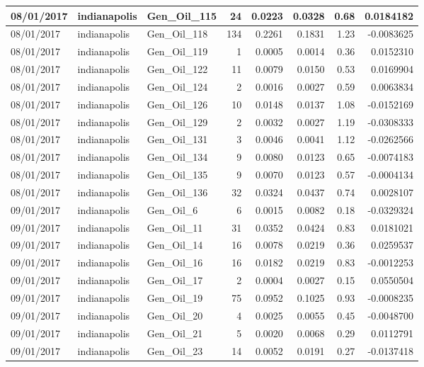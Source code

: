 \documentclass[
  letterpaper,
  DIV=11,
  numbers=noendperiod]{scrartcl}
\begin{document}
\begin{tabular}{l|l|l|r|r|r|r|r}
\hline
08/01/2017 & indianapolis & Gen\_Oil\_115 & 24 & 0.0223 & 0.0328 & 0.68 & 0.0184182\\
\hline
08/01/2017 & indianapolis & Gen\_Oil\_118 & 134 & 0.2261 & 0.1831 & 1.23 & -0.0083625\\
\hline
08/01/2017 & indianapolis & Gen\_Oil\_119 & 1 & 0.0005 & 0.0014 & 0.36 & 0.0152310\\
\hline
08/01/2017 & indianapolis & Gen\_Oil\_122 & 11 & 0.0079 & 0.0150 & 0.53 & 0.0169904\\
\hline
08/01/2017 & indianapolis & Gen\_Oil\_124 & 2 & 0.0016 & 0.0027 & 0.59 & 0.0063834\\
\hline
08/01/2017 & indianapolis & Gen\_Oil\_126 & 10 & 0.0148 & 0.0137 & 1.08 & -0.0152169\\
\hline
08/01/2017 & indianapolis & Gen\_Oil\_129 & 2 & 0.0032 & 0.0027 & 1.19 & -0.0308333\\
\hline
08/01/2017 & indianapolis & Gen\_Oil\_131 & 3 & 0.0046 & 0.0041 & 1.12 & -0.0262566\\
\hline
08/01/2017 & indianapolis & Gen\_Oil\_134 & 9 & 0.0080 & 0.0123 & 0.65 & -0.0074183\\
\hline
08/01/2017 & indianapolis & Gen\_Oil\_135 & 9 & 0.0070 & 0.0123 & 0.57 & -0.0004134\\
\hline
08/01/2017 & indianapolis & Gen\_Oil\_136 & 32 & 0.0324 & 0.0437 & 0.74 & 0.0028107\\
\hline
09/01/2017 & indianapolis & Gen\_Oil\_6 & 6 & 0.0015 & 0.0082 & 0.18 & -0.0329324\\
\hline
09/01/2017 & indianapolis & Gen\_Oil\_11 & 31 & 0.0352 & 0.0424 & 0.83 & 0.0181021\\
\hline
09/01/2017 & indianapolis & Gen\_Oil\_14 & 16 & 0.0078 & 0.0219 & 0.36 & 0.0259537\\
\hline
09/01/2017 & indianapolis & Gen\_Oil\_16 & 16 & 0.0182 & 0.0219 & 0.83 & -0.0012253\\
\hline
09/01/2017 & indianapolis & Gen\_Oil\_17 & 2 & 0.0004 & 0.0027 & 0.15 & 0.0550504\\
\hline
09/01/2017 & indianapolis & Gen\_Oil\_19 & 75 & 0.0952 & 0.1025 & 0.93 & -0.0008235\\
\hline
09/01/2017 & indianapolis & Gen\_Oil\_20 & 4 & 0.0025 & 0.0055 & 0.45 & -0.0048700\\
\hline
09/01/2017 & indianapolis & Gen\_Oil\_21 & 5 & 0.0020 & 0.0068 & 0.29 & 0.0112791\\
\hline
09/01/2017 & indianapolis & Gen\_Oil\_23 & 14 & 0.0052 & 0.0191 & 0.27 & -0.0137418\\

\end{tabular}
\end{document}
